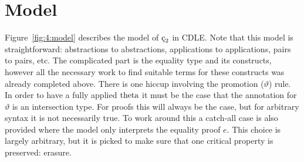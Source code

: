 




\section{Model}

Figure~\ref{fig:4:model} describes the model of $\ced$ in CDLE.
Note that this model is straightforward: abstractions to abstractions, applications to applications, pairs to pairs, etc.
The complicated part is the equality type and its constructs, however all the necessary work to find suitable terms for these constructs was already completed above.
There is one hiccup involving the promotion ($\vartheta$) rule.
In order to have a fully applied $\textnormal{theta}$ it must be the case that the annotation for $\vartheta$ is an intersection type.
For proofs this will always be the case, but for arbitrary syntax it is not necessarily true.
To work around this a catch-all case is also provided where the model only interprets the equality proof $e$.
This choice is largely arbitrary, but it is picked to make sure that one critical property is preserved: erasure.



